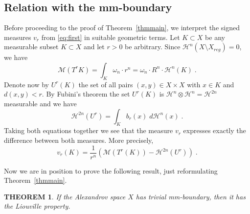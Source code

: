 \documentclass[12pt,leqno]{amsart}
\numberwithin{equation}{section}
\newtheorem{thm}{THEOREM}[section]
\theoremstyle{definition}
\theoremstyle{remark}
\newcommand{\tref}[1]{Theorem~\ref{#1}}
\begin{document}
\subsection{Relation with the mm-boundary}
Before proceeding to the proof of  \tref{thmmain}, we interpret the signed measures $v_r$ from \eqref{eq:first} in suitable geometric terms.
Let $K\subset X$ be   any measurable  subset $K\subset X$ and let $r>0$ be arbitrary.
Since $\mathcal H^n (X\setminus X_{reg} )=0$, we have  
$$\mathcal M (T^r K) =\int _K \omega _n \cdot r^n  =\omega _n \cdot R^n \cdot \mathcal H^n (K) \; .$$
Denote now by $U^r(K)$ the set of all pairs $(x,y)\in X\times X$ with $x\in K$ and $d(x,y)<r$.
By Fubini's theorem the set $U^r(K)$ is $\mathcal H^n \otimes \mathcal H^n =\mathcal H^{2n}$ measurable and we have
$$\mathcal H^{2n} (U^r)= \int _K b_r (x) \;  d\mathcal H^n (x) \;. $$
Taking both equations  together we see that the measure $v_r$ expresses exactly the difference between both measures. More precisely,
\begin{equation} \label{eq:compare}
v_r (K) = \frac 1 {r^n} (\mathcal M (T^r (K))- \mathcal H^{2n} (U^r) )\;. 
\end{equation} 



Now we are in position to prove the following result, just reformulating \tref{thmmain}.
\begin{thm} \label{reform}
If the Alexandrov space $X$ has trivial mm-boundary, then  it has the Liouville property.
\end{thm}
\end{document}
